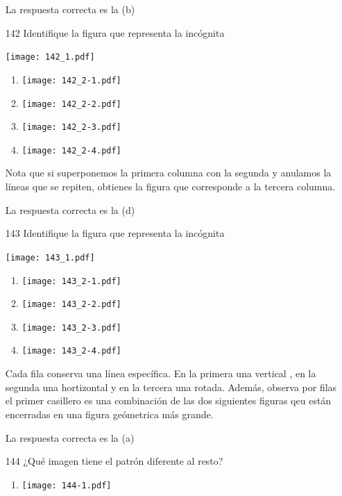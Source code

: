 \documentclass[11pt, a4paper]{article} %
\theoremstyle{dotlessP}
\theoremstyle{dotlessS}
\begin{document}
\begin{enumerate}[label=\color{dg}\theenumi.]
  {\color{dh} La respuesta correcta es la (b)}
  \item[142] {\color{db}Identifique la figura que representa la incógnita
}
 \begin{center}
  		\texttt{[image: 142\_1.pdf]}
  \end{center}
 
\begin{enumerate}
\item 
	        \texttt{[image: 142\_2-1.pdf]}
    
\item 
    	    \texttt{[image: 142\_2-2.pdf]}
\item
        	\texttt{[image: 142\_2-3.pdf]}
 \item
           	\texttt{[image: 142\_2-4.pdf]}
\end{enumerate}
  
 Nota que si superponemos la primera columna con la segunda y anulamos la líneas que se repiten, obtienes la figura que corresponde a la tercera columna. 
 
  {\color{dh} La respuesta correcta es la (d)}
   \item[143] {\color{db}Identifique la figura que representa la incógnita 
}
 \begin{center}
  		\texttt{[image: 143\_1.pdf]}
  \end{center}
 
 \begin{enumerate}
\item 
	      \texttt{[image: 143\_2-1.pdf]}
    
\item
    	   \texttt{[image: 143\_2-2.pdf]}
\item
        	\texttt{[image: 143\_2-3.pdf]}
 \item
           	\texttt{[image: 143\_2-4.pdf]}
\end{enumerate}
  
  Cada fila conserva una línea específica. En la primera una vertical , en la segunda una hortizontal y en la tercera una rotada. Además, observa por filas el primer casillero es una combinación de las dos siguientes figuras qeu están  encerradas en una figura geómetrica más grande.  
  
  {\color{dh} La respuesta correcta es la  (a)}
  
  \item[144] {\color{db}¿Qué imagen tiene el patrón diferente al resto?
}
\begin{enumerate}
\item 
	     \texttt{[image: 144-1.pdf]}
    

\end{enumerate}
\end{enumerate}
\end{document}
